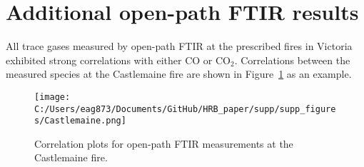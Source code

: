 \documentclass[acp, manuscript]{copernicus}
\begin{document}
\section{Additional open-path FTIR results}
All trace gases measured by open-path FTIR at the prescribed fires in Victoria exhibited strong correlations with either CO or CO$_2$. Correlations between the measured species at the Castlemaine fire are shown in Figure~\ref{fig:Castlemaine} as an example. 

\begin{figure}
  \texttt{[image: C:/Users/eag873/Documents/GitHub/HRB\_paper/supp/supp\_figures/Castlemaine.png]}
  \caption{Correlation plots for open-path FTIR measurements at the Castlemaine fire.}
  \label{fig:Castlemaine}
\end{figure}






\end{document}
